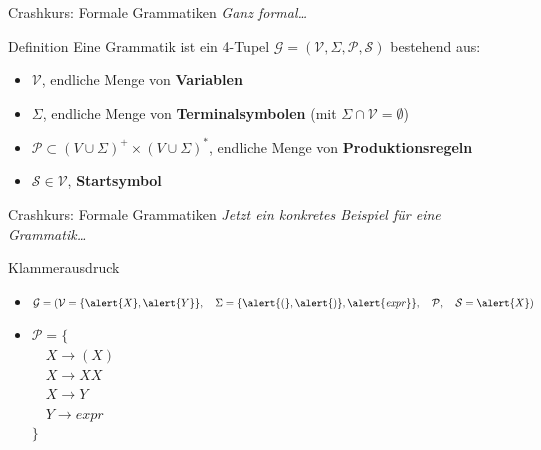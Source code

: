 \documentclass[18pt]{beamer}
\begin{document}
\begin{frame}{Crashkurs: Formale Grammatiken}
    \textit{Ganz formal\dots}
    \begin{block}{Definition}
        Eine Grammatik ist ein 4-Tupel $\mathcal{G} = (\mathcal{V}, \Sigma, \mathcal{P}, \mathcal{S})$ bestehend aus:
        \begin{itemize}
            \item $\mathcal{V}$, endliche Menge von \textbf{Variablen}
            \item $\Sigma$, endliche Menge von \textbf{Terminalsymbolen} (mit $\Sigma \cap \mathcal{V} = \emptyset$)
            \item $\mathcal{P} \subset (V \cup \Sigma)^+ \times (V \cup \Sigma)^*$, endliche Menge von \textbf{Produktionsregeln}
            \item $\mathcal{S} \in \mathcal{V}$, \textbf{Startsymbol}
        \end{itemize}
    \end{block}
\end{frame}

\begin{frame}{Crashkurs: Formale Grammatiken}
    \textit{Jetzt ein konkretes Beispiel für eine Grammatik\dots}
    \begin{block}{Klammerausdruck}
        \begin{itemize}
            \item $\mathcal{G} = (\mathcal{V} = \{\alert{X}, \alert{Y}\}, \quad \Sigma = \{\alert{(}, \alert{)}, \alert{\mathit{expr}}\}, \quad \mathcal{P}, \quad \mathcal{S} = \alert{X})$
            \item $\mathcal{P} = \{$\\
            $\quad X \longrightarrow (X)$\\
            $\quad X \longrightarrow XX$\\
            $\quad X \longrightarrow Y$\\
            $\quad Y \longrightarrow \mathit{expr}$\\
            $\}$
        \end{itemize}
    \end{block}
\end{frame}
\end{document}
